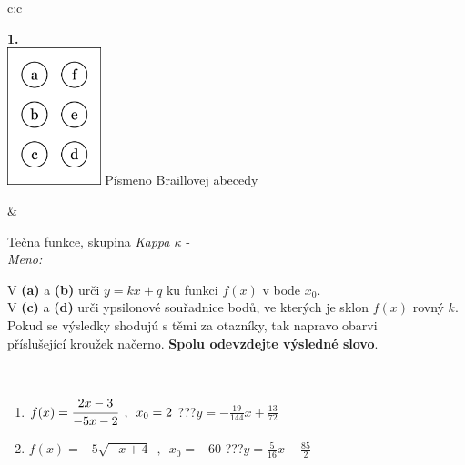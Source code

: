 \documentclass[10pt]{report}
\begin{document}
\begin{tabular}{c:c}
\begin{minipage}[c][104.5mm][t]{0.5\linewidth}
\begin{center}
\begin{minipage}{0.20\linewidth}
\begin{center}
{\Huge\bfseries 1.} \\[2mm]
\includegraphics[height=40mm]{../images/braille.png}
{\small Písmeno Braillovej abecedy}
\end{center}
\end{minipage}
\end{center}
\end{minipage}
&
\begin{minipage}[c][104.5mm][t]{0.5\linewidth}
\begin{center}
\vspace{7mm}
{\huge Tečna funkce, skupina \textit{Kappa $\kappa$} -}\\[5mm]
\textit{Meno:}\phantom{xxxxxxxxxxxxxxxxxxxxxxxxxxxxxxxxxxxxxxxxxxxxxxxxxxxxxxxxxxxxxxxxx}\\[5mm]
\begin{minipage}{0.95\linewidth}
\begin{center}
V \textbf{(a)} a \textbf{(b)} urči  $y = kx + q$ ku funkci $f(x)$ v bode $x_0$.\\V \textbf{(c)} a \textbf{(d)} urči ypsilonové souřadnice bodů, ve kterých je sklon $f(x)$ rovný $k$.\\Pokud se výsledky shodujú s těmi za otazníky, tak napravo obarvi\\příslušející kroužek načerno. \textbf{Spolu odevzdejte výsledné slovo}.
\end{center}
\end{minipage}
\\[1mm]
\begin{minipage}{0.79\linewidth}
\begin{center}
\begin{varwidth}{\linewidth}
\begin{enumerate}
\small
\item $f(x)=\cfrac{2x-3}{-5x-2}\enspace , \enspace x_0=2$\quad \dotfill\; ???\;\dotfill \quad $y = -\frac{19}{144}x+\frac{13}{72}$
\item $f(x)=-5\sqrt{-x+4}\enspace , \enspace x_0=-60$\quad \dotfill\; ???\;\dotfill \quad $y = \frac{5}{16}x-\frac{85}{2}$

\end{enumerate}
\end{varwidth}
\end{center}
\end{minipage}
\end{center}
\end{minipage}
\end{tabular}
\end{document}
